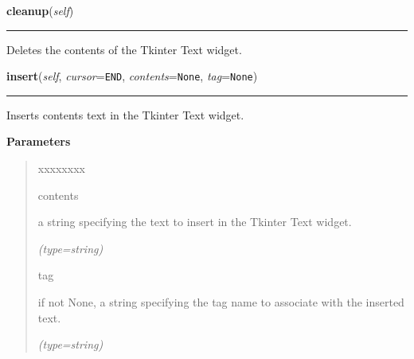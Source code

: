     \label{nMOLDYN:GUI:Widgets:ComboText:cleanup}

    \vspace{0.5ex}

\hspace{.8\funcindent}\begin{boxedminipage}{\funcwidth}

    \raggedright \textbf{cleanup}(\textit{self})

    \vspace{-1.5ex}

    \rule{\textwidth}{0.5\fboxrule}
\setlength{\parskip}{2ex}
    Deletes the contents of the Tkinter Text widget.

\setlength{\parskip}{1ex}
    \end{boxedminipage}

    \label{nMOLDYN:GUI:Widgets:ComboText:insert}

    \vspace{0.5ex}

\hspace{.8\funcindent}\begin{boxedminipage}{\funcwidth}

    \raggedright \textbf{insert}(\textit{self}, \textit{cursor}={\tt END}, \textit{contents}={\tt None}, \textit{tag}={\tt None})

    \vspace{-1.5ex}

    \rule{\textwidth}{0.5\fboxrule}
\setlength{\parskip}{2ex}
    Inserts {\textbar}contents{\textbar} text in the Tkinter Text widget.

\setlength{\parskip}{1ex}
      \textbf{Parameters}
      \vspace{-1ex}

      \begin{quote}
        \begin{Ventry}{xxxxxxxx}

          \item[contents]

          a string specifying the text to insert in the Tkinter Text 
          widget.

            {\it (type=string)}

          \item[tag]

          if not None, a string specifying the tag name to associate with 
          the inserted text.

            {\it (type=string)}

        \end{Ventry}

      \end{quote}

    \end{boxedminipage}

